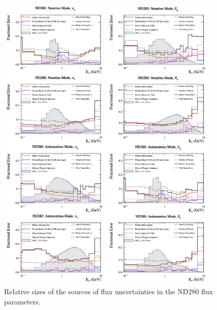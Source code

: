 \begin{center}
\begin{figure}[!htbp]
\begin{adjustwidth}{-.9in}{-.9in}
\centering
\includegraphics*[width=0.95\textwidth,clip]{figs/fluxsourceND}
\caption{Relative sizes of the sources of flux uncertainties in the ND280 flux parameters.}\label{fig:fluxsourceND}
\end{adjustwidth}
\end{figure}
\end{center}

